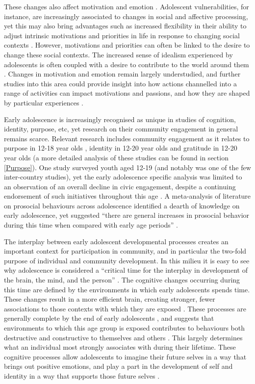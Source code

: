These changes also affect motivation and emotion \citep{Dahl2004}. Adolescent vulnerabilities, for instance, are increasingly associated to changes in social and affective processing, yet this may also bring advantages such as increased flexibility in their ability to adjust intrinsic motivations and priorities in life in response to changing social contexts \citep{Crone2012}. However, motivations and priorities can often be linked to the desire to change these social contexts. The increased sense of idealism experienced by adolescents is often coupled with a desire to contribute to the world around them \citep{Dahl2004}. Changes in motivation and emotion remain largely understudied, and further studies into this area could provide insight into how actions channelled into a range of activities can impact motivations and passions, and how they are shaped by particular experiences \citep{Dahl2004}. 

Early adolescence is increasingly recognised as unique in studies of cognition, identity, purpose, etc, yet research on their community engagement in general remains scarce. Relevant research includes community engagement as it relates to purpose in 12-18 year olds \citep{Barber2013}, identity in 12-20 year olds \citep{VanGoethem2012} and gratitude in 12-20 year olds \citep{Froh2010} (a more detailed analysis of these studies can be found in section \ref{Purpose}). One study surveyed youth aged 12-19 (and notably was one of the few inter-country studies), yet the early adolescence specific analysis was limited to an observation of an overall decline in civic engagement, despite a continuing endorsement of such initiatives throughout this age \citep{Flanagan1999}. A meta-analysis of literature on prosocial behaviours across adolescence identified a dearth of knowledge on early adolescence, yet suggested “there are general increases in prosocial behavior during this time when compared with early age periods” \citep[][p5]{Fabes1999}. 

The interplay between early adolescent developmental processes creates an important context for participation in community, and in particular the two-fold purpose of individual and community development. In this milieu it is easy to see why adolescence is considered a “critical time for the interplay in development of the brain, the mind, and the person” \citep[][p65]{Kuhn2006}. The cognitive changes occurring during this time are defined by the environments in which early adolescents spends time. These changes result in a more efficient brain, creating stronger, fewer associations to those contexts with which they are exposed \citep{Blakemore2012,Kuhn2006}. These processes are generally complete by the end of early adolescents \citep{Kuhn2006}, and suggests that environments to which this age group is exposed contributes to behaviours both destructive and constructive to themselves and others \citep{NationalInstituteofMentalHealth2011}. This largely determines what an individual most strongly associates with during their lifetime. These cognitive processes allow adolescents to imagine their future selves in a way that brings out positive emotions, and play a part in the development of self and identity in a way that supports those future selves \citep{Dahl2004}.

